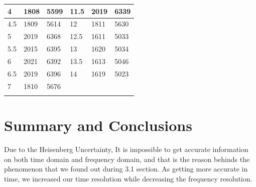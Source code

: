 \documentclass[12pt]{article}
\begin{document}
\begin{table}[H]
\begin{tabular}{llllll}
\multicolumn{1}{|l|}{4}         & \multicolumn{1}{l|}{1808}      & \multicolumn{1}{l|}{5599}         & \multicolumn{1}{l|}{11.5}      & \multicolumn{1}{l|}{2019}      & \multicolumn{1}{l|}{6339}         \\ \hline
\multicolumn{1}{|l|}{4.5}       & \multicolumn{1}{l|}{1809}      & \multicolumn{1}{l|}{5614}         & \multicolumn{1}{l|}{12}        & \multicolumn{1}{l|}{1811}      & \multicolumn{1}{l|}{5630}         \\ \hline
\multicolumn{1}{|l|}{5}         & \multicolumn{1}{l|}{2019}      & \multicolumn{1}{l|}{6368}         & \multicolumn{1}{l|}{12.5}      & \multicolumn{1}{l|}{1611}      & \multicolumn{1}{l|}{5033}         \\ \hline
\multicolumn{1}{|l|}{5.5}       & \multicolumn{1}{l|}{2015}      & \multicolumn{1}{l|}{6395}         & \multicolumn{1}{l|}{13}        & \multicolumn{1}{l|}{1620}      & \multicolumn{1}{l|}{5034}         \\ \hline
\multicolumn{1}{|l|}{6}         & \multicolumn{1}{l|}{2021}      & \multicolumn{1}{l|}{6392}         & \multicolumn{1}{l|}{13.5}      & \multicolumn{1}{l|}{1613}      & \multicolumn{1}{l|}{5046}         \\ \hline
\multicolumn{1}{|l|}{6.5}       & \multicolumn{1}{l|}{2019}      & \multicolumn{1}{l|}{6396}         & \multicolumn{1}{l|}{14}        & \multicolumn{1}{l|}{1619}      & \multicolumn{1}{l|}{5023}         \\ \hline
\multicolumn{1}{|l|}{7}         & \multicolumn{1}{l|}{1810}      & \multicolumn{1}{l|}{5676}         & \multicolumn{1}{l|}{}          & \multicolumn{1}{l|}{}          & \multicolumn{1}{l|}{}             \\ \hline
                                &                                &                                   &                                &                                &                                   \\

\end{tabular}
\end{table}
\section{Summary and Conclusions}
Due to the Heisenberg Uncertainty, It is impossible to get accurate information on both time domain and frequency domain, and that is the reason behinds the phenomenon that we found out during 3.1 section. As getting more accurate in time, we increased our time resolution while decreasing the frequency resolution.
\end{document}
